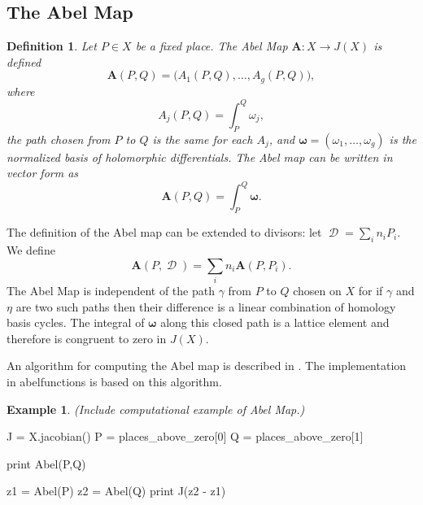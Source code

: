 \documentclass[12pt]{article}
\newtheorem{definition}[theorem]{Definition}
\theoremstyle{definition}
\newtheorem{example}[theorem]{Example}
\DeclareMathOperator{\DivD}{\mathcal{D}}
\begin{document}
\subsection{The Abel Map}


\begin{definition}\label{def:abelmap}
  Let $P \in X$ be a fixed place. The Abel Map $\boldsymbol{A} : X \to
  J(X)$ is defined
  \begin{equation} \label{eqn:abel1}
    \boldsymbol{A}(P,Q) = \big( A_1(P,Q), \ldots, A_g(P,Q) \big),
  \end{equation}
  where
  \begin{equation} \label{eqn:abel2}
    A_j(P,Q) = \int_P^Q \omega_j,
  \end{equation}
  the path chosen from $P$ to $Q$ is the same for each $A_j$, and
  $\boldsymbol{\omega} = (\omega_1,\ldots,\omega_g)$ is the normalized
  basis of holomorphic differentials. The Abel map can be written in
  vector form as
  \begin{equation} \label{eqn:abel-vector}
    \boldsymbol{A}(P,Q) = \int_P^Q \boldsymbol{\omega}.
  \end{equation}
\end{definition}
The definition of the Abel map can be extended to divisors: let $\DivD =
\sum_i n_i P_i$. We define
\begin{equation} \label{eqn:abel-divisors}
  \boldsymbol{A}(P,\DivD) = \sum_i n_i \boldsymbol{A}(P,P_i).
\end{equation}
The Abel Map is independent of the path $\gamma$ from $P$ to $Q$ chosen
on $X$ for if $\gamma$ and $\eta$ are two such paths then their
difference is a linear combination of homology basis cycles. The
integral of $\boldsymbol{\omega}$ along this closed path is a lattice
element and therefore is congruent to zero in $J(X)$.

An algorithm for computing the Abel map is described in
\cite{DeconinckPatterson11}. The implementation in {\sc abelfunctions}
is based on this algorithm.

\begin{example}
  {\it (Include computational example of Abel Map.)}

\begin{ipythoninput}
J = X.jacobian()
P = places_above_zero[0]
Q = places_above_zero[1]

print Abel(P,Q)

z1 = Abel(P)
z2 = Abel(Q)
print J(z2 - z1)
\end{ipythoninput}
\begin{ipythonoutput}
[XXX]
\end{ipythonoutput}

\end{example}
\end{document}

